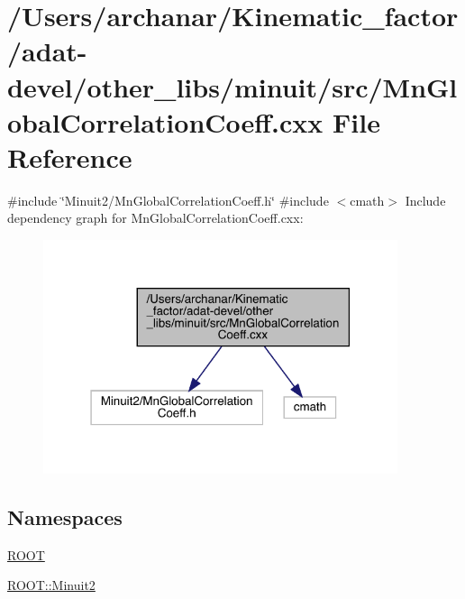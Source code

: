 \hypertarget{adat-devel_2other__libs_2minuit_2src_2MnGlobalCorrelationCoeff_8cxx}{}\section{/\+Users/archanar/\+Kinematic\+\_\+factor/adat-\/devel/other\+\_\+libs/minuit/src/\+Mn\+Global\+Correlation\+Coeff.cxx File Reference}
\label{adat-devel_2other__libs_2minuit_2src_2MnGlobalCorrelationCoeff_8cxx}
{\ttfamily \#include \char`\"{}Minuit2/\+Mn\+Global\+Correlation\+Coeff.\+h\char`\"{}}\newline
{\ttfamily \#include $<$cmath$>$}\newline
Include dependency graph for Mn\+Global\+Correlation\+Coeff.\+cxx\+:
\nopagebreak
\begin{figure}[H]
\begin{center}
\leavevmode
\includegraphics[width=295pt]{db/d95/adat-devel_2other__libs_2minuit_2src_2MnGlobalCorrelationCoeff_8cxx__incl}
\end{center}
\end{figure}
\subsection*{Namespaces}
\begin{DoxyCompactItemize}
\item 
 \mbox{\hyperlink{namespaceROOT}{R\+O\+OT}}
\item 
 \mbox{\hyperlink{namespaceROOT_1_1Minuit2}{R\+O\+O\+T\+::\+Minuit2}}
\end{DoxyCompactItemize}
